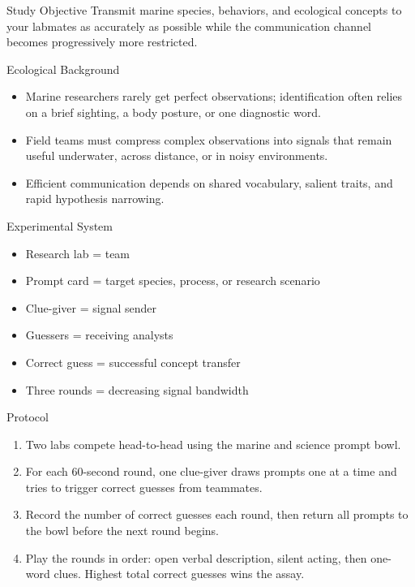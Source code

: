 \documentclass[10pt]{article}
\begin{document}
\begin{minipage}[t]{0.485\textwidth}
\vspace{0pt}
\begin{labbox}{Study Objective}
Transmit marine species, behaviors, and ecological concepts to your labmates as accurately as possible while the communication channel becomes progressively more restricted.
\end{labbox}

\begin{labbox}{Ecological Background}
\begin{itemize}
\item Marine researchers rarely get perfect observations; identification often relies on a brief sighting, a body posture, or one diagnostic word.
\item Field teams must compress complex observations into signals that remain useful underwater, across distance, or in noisy environments.
\item Efficient communication depends on shared vocabulary, salient traits, and rapid hypothesis narrowing.
\end{itemize}
\end{labbox}

\begin{labbox}{Experimental System}
\begin{itemize}
\item Research lab = team
\item Prompt card = target species, process, or research scenario
\item Clue-giver = signal sender
\item Guessers = receiving analysts
\item Correct guess = successful concept transfer
\item Three rounds = decreasing signal bandwidth
\end{itemize}
\end{labbox}

\begin{labbox}{Protocol}
\begin{enumerate}
\item Two labs compete head-to-head using the marine and science prompt bowl.
\item For each 60-second round, one clue-giver draws prompts one at a time and tries to trigger correct guesses from teammates.
\item Record the number of correct guesses each round, then return all prompts to the bowl before the next round begins.
\item Play the rounds in order: open verbal description, silent acting, then one-word clues. Highest total correct guesses wins the assay.
\end{enumerate}
\end{labbox}
\end{minipage}\hfill
\end{document}
